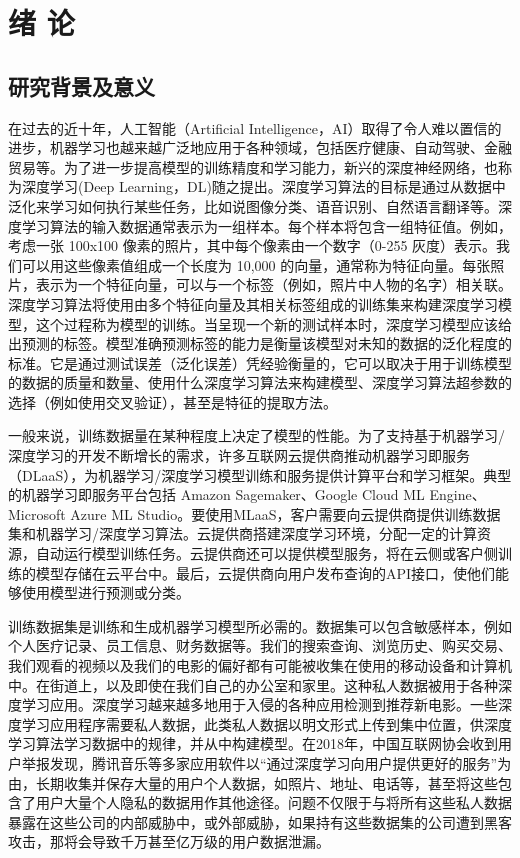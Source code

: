 \chapter{绪\hskip 0.4cm 论}
\label{ch1}

\section{研究背景及意义}
在过去的近十年，人工智能（Artificial Intelligence，AI）取得了令人难以置信的进步，机器学习也越来越广泛地应用于各种领域，包括医疗健康、自动驾驶、金融贸易等。为了进一步提高模型的训练精度和学习能力，新兴的深度神经网络，也称为深度学习(Deep Learning，DL)随之提出。深度学习算法的目标是通过从数据中泛化来学习如何执行某些任务，比如说图像分类、语音识别、自然语言翻译等。深度学习算法的输入数据通常表示为一组样本。每个样本将包含一组特征值。例如，考虑一张 100x100 像素的照片，其中每个像素由一个数字（0-255 灰度）表示。我们可以用这些像素值组成一个长度为 10,000 的向量，通常称为特征向量。每张照片，表示为一个特征向量，可以与一个标签（例如，照片中人物的名字）相关联。深度学习算法将使用由多个特征向量及其相关标签组成的训练集来构建深度学习模型，这个过程称为模型的训练。当呈现一个新的测试样本时，深度学习模型应该给出预测的标签。模型准确预测标签的能力是衡量该模型对未知的数据的泛化程度的标准。它是通过测试误差（泛化误差）凭经验衡量的，它可以取决于用于训练模型的数据的质量和数量、使用什么深度学习算法来构建模型、深度学习算法超参数的选择（例如使用交叉验证），甚至是特征的提取方法。

一般来说，训练数据量在某种程度上决定了模型的性能。为了支持基于机器学习/深度学习的开发不断增长的需求，许多互联网云提供商推动机器学习即服务（DLaaS），为机器学习/深度学习模型训练和服务提供计算平台和学习框架。典型的机器学习即服务平台包括 Amazon Sagemaker、Google Cloud ML Engine、Microsoft Azure ML Studio。要使用MLaaS，客户需要向云提供商提供训练数据集和机器学习/深度学习算法。云提供商搭建深度学习环境，分配一定的计算资源，自动运行模型训练任务。云提供商还可以提供模型服务，将在云侧或客户侧训练的模型存储在云平台中。最后，云提供商向用户发布查询的API接口，使他们能够使用模型进行预测或分类。

训练数据集是训练和生成机器学习模型所必需的。数据集可以包含敏感样本，例如个人医疗记录、员工信息、财务数据等。我们的搜索查询、浏览历史、购买交易、我们观看的视频以及我们的电影的偏好都有可能被收集在使用的移动设备和计算机中。在街道上，以及即使在我们自己的办公室和家里。这种私人数据被用于各种深度学习应用。深度学习越来越多地用于入侵的各种应用检测到推荐新电影。一些深度学习应用程序需要私人数据，此类私人数据以明文形式上传到集中位置，供深度学习算法学习数据中的规律，并从中构建模型。在2018年，中国互联网协会收到用户举报发现，腾讯音乐等多家应用软件以“通过深度学习向用户提供更好的服务”为由，长期收集并保存大量的用户个人数据，如照片、地址、电话等，甚至将这些包含了用户大量个人隐私的数据用作其他途径。问题不仅限于与将所有这些私人数据暴露在这些公司的内部威胁中，或外部威胁，如果持有这些数据集的公司遭到黑客攻击，那将会导致千万甚至亿万级的用户数据泄漏。

